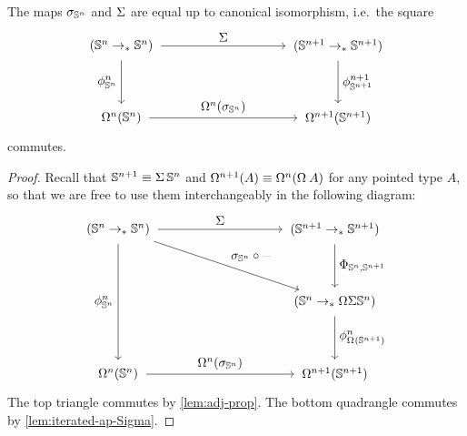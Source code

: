 \documentclass[english,a4paper]{lmcs}
\begin{document}
\begin{lem} \label{lem:sigma-susp}
  The maps $\sigma_{{\mathbb S^{n}}}$ and $\operatorname{\Sigma}$ are equal up to canonical isomorphism, i.e.\ the square
  \begin{equation} \label{eq:needs-to-commute}
    \begin{tikzpicture}[x=6cm,y=-2cm,baseline=(current bounding box.center)]
    \tikzset{arrow/.style={shorten >=0.1cm,shorten <=.1cm,->}}
    \node (A) at (0,0) {$(\Sn n \to_* \Sn n)$};
    \node (B) at (0,1) {$\Omega^n(\Sn n)$};
    \node (C) at (1,1) {$\Omega^{n+1}(\Sn {n+1})$};
    \node (D) at (1,0) {$(\Sn {n+1} \to_* \Sn {n+1})$};

    \draw[arrow] (A) to node [left] {$\phi_{\Sn n}^n$} (B);
    \draw[arrow] (B) to node [above] {$\Omega^n(\sigma_{\Sn n})$} (C);
    \draw[arrow] (D) to node [right] {$\phi_{\Sn {n+1}}^{n+1}$} (C);
    \draw[arrow] (A) to node [above] {$\susp$} (D);
    \end{tikzpicture}
  \end{equation}
  commutes.
\end{lem}
\begin{proof}%
  Recall that ${\mathbb S^{n+1}} \equiv \operatorname{\Sigma} {{\mathbb S^{n}}}$ and $\loopspace {n+1}(A) \jdeq
  \loopspace n (\loopspace\null A)$ for any pointed type $A$, so that we are
  free to use them interchangeably
  in the following diagram:
\begin{equation}
\begin{tikzpicture}[x=6cm,y=-2cm,baseline=(current bounding box.center)]
\tikzset{arrow/.style={shorten >=0.1cm,shorten <=.1cm,->}}
\node (A) at (0,0) {$(\Sn n \to_* \Sn n)$};
\node (B) at (0,2) {$\Omega^n(\Sn n)$};
\node (C) at (1,2) {$\Omega^{n+1}(\Sn {n+1})$};
\node (D) at (1,0) {$(\Sn {n+1} \to_* \Sn {n+1})$};
\node (E) at (1,1) {$(\Sn n \to_* \Omega \Sigma \Sn n)$};

\draw[arrow] (A) to node [left] {$\phi^n_{\Sn n}$} (B);
\draw[arrow] (B) to node [above] {$\loopspace n(\sigma_{\Sn n})$} (C);
\draw[arrow] (A) to node [above] {$\susp$} (D);
\draw[arrow] (D) to node [right] {$\Phi_{\Sn n,\Sn {n+1}}$} (E);
\draw[arrow] (E) to node [right] {$\phi^n_{\loopspace\null(\Sn {n+1})}$} (C);
\draw[arrow] (A) to node [above right] {$\sigma_{\Sn n} \circ \blank$} (E);
\end{tikzpicture}
\end{equation}
The top triangle commutes by \cref{lem:adj-prop}.
The bottom quadrangle commutes by \cref{lem:iterated-ap-Sigma}.
\end{proof}
\end{document}
